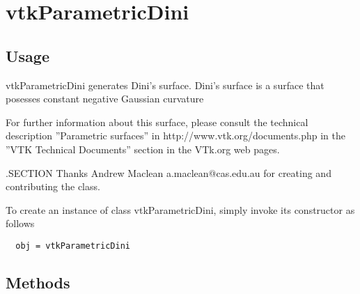 \section{vtkParametricDini}

\subsection{Usage}

 vtkParametricDini generates Dini's surface.
 Dini's surface is a surface that posesses constant negative 
 Gaussian curvature

 For further information about this surface, please consult the 
 technical description ''Parametric surfaces'' in http://www.vtk.org/documents.php 
 in the ''VTK Technical Documents'' section in the VTk.org web pages.

 .SECTION Thanks
 Andrew Maclean a.maclean@cas.edu.au for 
 creating and contributing the class.


To create an instance of class vtkParametricDini, simply
invoke its constructor as follows
\begin{verbatim}
  obj = vtkParametricDini
\end{verbatim}
\subsection{Methods}

